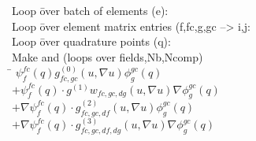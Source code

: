 \begin{tabbing}
  Loop \=over batch of elements (e):\\
  \>Loop \=over element matrix entries (f,fc,g,gc --> i,j:\\
  \>\>Loop \=over quadrature points (q):\\
  \>\>\>Make  and  (loops over fields,Nb,Ncomp)\\
  \>\>\>  \= $\psi^{fc}_f(q) g^{(0)}_{fc,gc}(u, \nabla u) \phi^{gc}_g(q)$\\
  \>\>\>\> $+ \psi^{fc}_f(q) \cdot g^{(1)}w_{fc,gc,dg}(u, \nabla u) \nabla\phi^{gc}_g(q)$\\
  \>\>\>\> $+ \nabla\psi^{fc}_f(q) \cdot g^{(2)}_{fc,gc,df}(u, \nabla u) \phi^{gc}_g(q)$\\
  \>\>\>\> $+ \nabla\psi^{fc}_f(q) \cdot g^{(3)}_{fc,gc,df,dg}(u, \nabla u) \nabla\phi^{gc}_g(q)$\\
\end{tabbing}



\endinput

